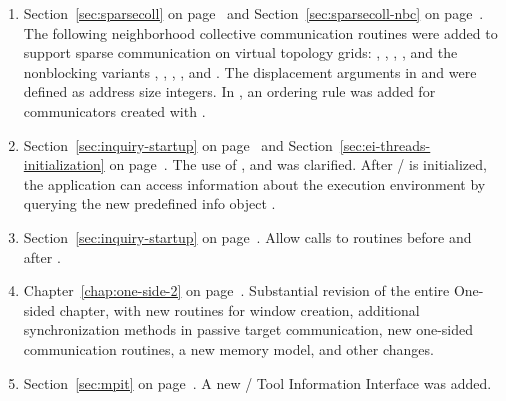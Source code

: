 \begin{enumerate}
\item 
Section~\ref{sec:sparsecoll} on page~\pageref{sec:sparsecoll} and
Section~\ref{sec:sparsecoll-nbc} on page~\pageref{sec:sparsecoll-nbc}.
\newline 
The following neighborhood collective communication routines 
were added to support sparse communication on virtual topology grids: 
, , 
, ,
 and the nonblocking variants  
, ,
, , and
.
The displacement arguments in 
and  were defined as address size integers.
In , an ordering rule was added
for communicators created with .  

\item 
Section~\ref{sec:inquiry-startup} on page~\pageref{sec:inquiry-startup} and
Section~\ref{sec:ei-threads-initialization} on page~\pageref{sec:ei-threads-initialization}. 
\newline 
The use of ,  and 
was clarified. 
After \MPI/ is initialized, the application can access information about the execution
environment by querying the new predefined info object .

\item 
Section~\ref{sec:inquiry-startup} on page~\pageref{sec:inquiry-startup}. 
\newline 
Allow calls to  routines before 
and after . 

\item 
Chapter~\ref{chap:one-side-2} on page~\pageref{chap:one-side-2}.
\newline 
Substantial revision of the entire One-sided chapter, with new routines for window creation, 
additional synchronization methods in passive target communication, new one-sided communication routines, 
a new memory model, and other changes. 

\item 
Section~\ref{sec:mpit} on page~\pageref{sec:mpit}. 
\newline 
A new \MPI/ Tool Information Interface was added.
 

\end{enumerate}
